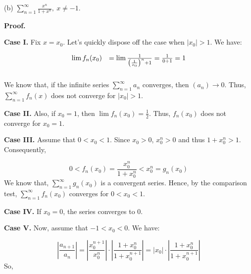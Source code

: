 \documentclass[10pt]{article}
\begin{document}
(b) $\displaystyle \sum _{n=1}^{\infty }\frac{x^{n}}{1+x^{n}} ,\ x\neq -1$.



\textbf{Proof.} \ 



\textbf{Case I.} Fix $\displaystyle x=x_{0}$. Let's quickly dispose off the case when $\displaystyle |x_{0} | >1$. We have:


\begin{equation*}
\begin{array}{ c c }
\lim f_{n}( x_{0}) & =\lim \frac{1}{\left(\frac{1}{x_{0}}\right)^{n} +1} =\frac{1}{0+1} =1\\
 & 
\end{array}
\end{equation*}
We know that, if the infinite series $\displaystyle \sum _{n=1}^{\infty } a_{n}$ converges, then $\displaystyle ( a_{n})\rightarrow 0$. Thus, $\displaystyle \sum _{n=1}^{\infty } f_{n}( x)$ does not converge for $\displaystyle |x_{0} | >1$. 



\textbf{Case II.} Also, if $\displaystyle x_{0} =1$, then $\displaystyle \lim f_{n}( x_{0}) =\frac{1}{2}$. Thus, $\displaystyle f_{n}( x_{0})$ does not converge for $\displaystyle x_{0} =1$.



\textbf{Case III.} Assume that $\displaystyle 0< x_{0} < 1$. Since $\displaystyle x_{0}  >0$, $\displaystyle x_{0}^{n}  >0$ and thus $\displaystyle 1+x_{0}^{n}  >1$. Consequently,


\begin{equation*}
0< f_{n}( x_{0}) =\frac{x_{0}^{n}}{1+x_{0}^{n}} < x_{0}^{n} =g_{n}( x_{0})
\end{equation*}
 We know that, $\displaystyle \sum _{n=1}^{\infty } g_{n}( x_{0})$ is a convergent series. Hence, by the comparison test, $\displaystyle \sum _{n=1}^{\infty } f_{n}( x_{0})$ converges for $\displaystyle 0< x_{0} < 1$. 



\textbf{Case IV.} If $\displaystyle x_{0} =0$, the series converges to $\displaystyle 0$.



\textbf{Case V.} Now, assume that $\displaystyle -1< x_{0} < 0$. We have:




\begin{equation*}
\left| \frac{a_{n+1}}{a_{n}}\right| =\left| \frac{x_{0}^{n+1}}{x_{0}^{n}}\right| \cdot \left| \frac{1+x_{0}^{n}}{1+x_{0}^{n+1}}\right| =|x_{0} |\cdot \left| \frac{1+x_{0}^{n}}{1+x_{0}^{n+1}}\right| 
\end{equation*}
So, 
\end{document}
